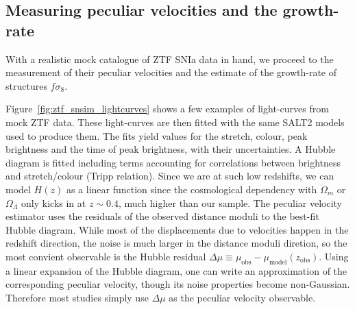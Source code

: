\subsection{Measuring peculiar velocities and the growth-rate}
\label{velocities:ztf_fs8:measurements}

With a realistic mock catalogue of ZTF SNIa data in hand, we proceed to the measurement of 
their peculiar velocities and the estimate of the growth-rate of structures $f\sigma_8$. 

Figure~\ref{fig:ztf_snsim_lightcurves} shows a few examples of light-curves from mock ZTF data.
These light-curves are then fitted with the same SALT2 models used to produce them. 
The fits yield values for the stretch, colour, peak brightness and the time of peak brightness, 
with their uncertainties. 
A Hubble diagram is fitted including terms accounting for correlations between brightness and 
stretch/colour (Tripp relation). 
Since we are at such low redshifts, we can model $H(z)$ as a linear function since 
the cosmological dependency with $\Omega_m$ or $\Omega_\Lambda$ only kicks in at $z \sim 0.4$, 
much higher than our sample. 
The peculiar velocity estimator uses the residuals of the observed distance moduli to the
best-fit Hubble diagram. While most of the displacements due to velocities happen in the redshift direction,
the noise is much larger in the distance moduli diretion, so the most convient observable is 
the Hubble residual $\Delta \mu \equiv \mu_\text{obs} - \mu_\text{model}(z_\text{obs})$. 
Using a linear expansion of the Hubble diagram, one can write an approximation of the corresponding 
peculiar velocity, though its noise properties become non-Gaussian. Therefore most studies 
simply use $\Delta \mu$ as the peculiar velocity observable. 


